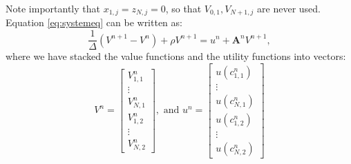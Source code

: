 \documentclass[12pt]{article}
\DeclareMathOperator{\1}{\mathbbm{1}}
\begin{document}
Note importantly that $x_{1,j}=z_{N,j}=0$, so that $V_{0,1},V_{N+1,j}$ are never used.  Equation \eqref{eq:systemeq} can be written as:
\begin{equation}
\frac{1}{\Delta} (V^{n+1} - V^n) + \rho V^{n+1} = u^n + \mathbf{A}^nV^{n+1},
\end{equation}
where we have stacked the value functions and the utility functions into vectors:
	\begin{equation*}
	V^{n}=\begin{bmatrix}
	V^n_{1,1} \\ 
	 \vdots \\
	V^n_{N,1} \\
	V^n_{1,2} \\
	\vdots \\
	V^n_{N,2}
	\end{bmatrix}, \text{ and } u^n=\begin{bmatrix}
	u(c^n_{1,1}) \\ 
	 \vdots \\
	u(c^n_{N,1}) \\
	u(c^n_{1,2}) \\
	\vdots \\
	u(c^n_{N,2})
	\end{bmatrix}
	\end{equation*}
\end{document}
